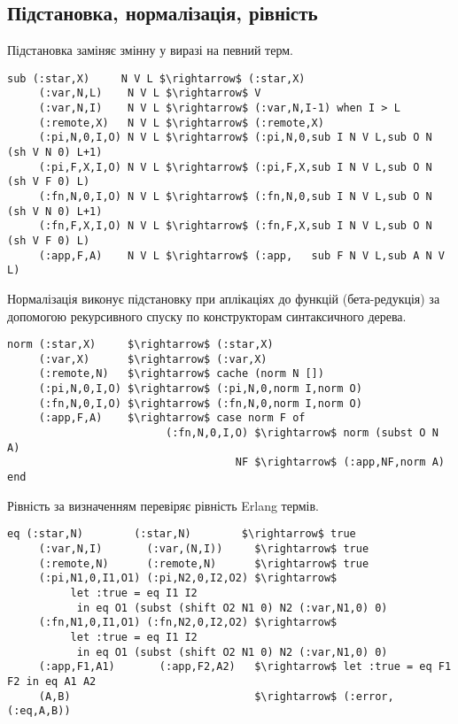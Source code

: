 \subsection*{Підстановка, нормалізація, рівність}
Підстановка заміняє змінну у виразі на певний терм.

\begin{lstlisting}[mathescape=true]
 sub (:star,X)     N V L $\rightarrow$ (:star,X)
     (:var,N,L)    N V L $\rightarrow$ V
     (:var,N,I)    N V L $\rightarrow$ (:var,N,I-1) when I > L
     (:remote,X)   N V L $\rightarrow$ (:remote,X)
     (:pi,N,0,I,O) N V L $\rightarrow$ (:pi,N,0,sub I N V L,sub O N (sh V N 0) L+1)
     (:pi,F,X,I,O) N V L $\rightarrow$ (:pi,F,X,sub I N V L,sub O N (sh V F 0) L)
     (:fn,N,0,I,O) N V L $\rightarrow$ (:fn,N,0,sub I N V L,sub O N (sh V N 0) L+1)
     (:fn,F,X,I,O) N V L $\rightarrow$ (:fn,F,X,sub I N V L,sub O N (sh V F 0) L)
     (:app,F,A)    N V L $\rightarrow$ (:app,   sub F N V L,sub A N V L)
\end{lstlisting}

Нормалізація виконує підстановку при аплікаціях до функцій (бета-редукція)
за допомогою рекурсивного спуску по конструкторам синтаксичного дерева.

\begin{lstlisting}[mathescape=true]
norm (:star,X)     $\rightarrow$ (:star,X)
     (:var,X)      $\rightarrow$ (:var,X)
     (:remote,N)   $\rightarrow$ cache (norm N [])
     (:pi,N,0,I,O) $\rightarrow$ (:pi,N,0,norm I,norm O)
     (:fn,N,0,I,O) $\rightarrow$ (:fn,N,0,norm I,norm O)
     (:app,F,A)    $\rightarrow$ case norm F of
                         (:fn,N,0,I,O) $\rightarrow$ norm (subst O N A)
                                    NF $\rightarrow$ (:app,NF,norm A) end
\end{lstlisting}

Рівність за визначенням перевіряє рівність Erlang термів.

\begin{lstlisting}[mathescape=true]
  eq (:star,N)        (:star,N)        $\rightarrow$ true
     (:var,N,I)       (:var,(N,I))     $\rightarrow$ true
     (:remote,N)      (:remote,N)      $\rightarrow$ true
     (:pi,N1,0,I1,O1) (:pi,N2,0,I2,O2) $\rightarrow$
          let :true = eq I1 I2
           in eq O1 (subst (shift O2 N1 0) N2 (:var,N1,0) 0)
     (:fn,N1,0,I1,O1) (:fn,N2,0,I2,O2) $\rightarrow$
          let :true = eq I1 I2
           in eq O1 (subst (shift O2 N1 0) N2 (:var,N1,0) 0)
     (:app,F1,A1)       (:app,F2,A2)   $\rightarrow$ let :true = eq F1 F2 in eq A1 A2
     (A,B)                             $\rightarrow$ (:error,(:eq,A,B))
\end{lstlisting}

